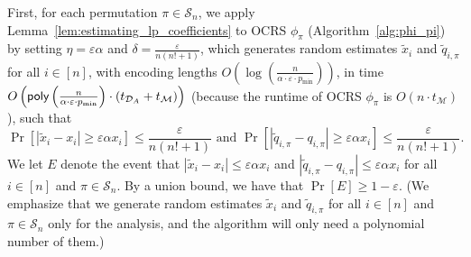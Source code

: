 \documentclass[11pt]{article}
\newcommand{\D}{\mathcal D}
\newcommand{\M}{{\mathcal M}}
\newcommand{\cS}{{\mathcal S}}
\newcommand{\eps}{\varepsilon}
\newcommand{\poly}{\textnormal{\sffamily poly}}
\begin{document}
First, for each permutation $\pi\in\cS_n$, we apply Lemma~\ref{lem:estimating_lp_coefficients} to OCRS $\phi_{\pi}$ (Algorithm~\ref{alg:phi_pi}) by setting $\eta=\eps\alpha$ and $\delta=\frac{\eps}{n(n!+1)}$, which generates random estimates $\tilde{x}_i$ and $\tilde{q}_{i,\pi}$ for all $i\in[n]$, with encoding lengths $O\left(\log\left(\frac{n}{\alpha\cdot\eps\cdot p_{\min}}\right)\right)$, in time $O\left(\poly\left(\frac{n}{\alpha\cdot\eps\cdot p_{\min}}\right)\cdot(t_{\D_{A}}+t_{\M})\right)$ (because the runtime of OCRS $\phi_{\pi}$ is $O(n\cdot t_{\M})$), such that
\[
    \Pr\left[|\tilde{x}_i-x_i|\ge\eps\alpha x_i\right]\le\frac{\eps}{n(n!+1)} \textrm{ and } \Pr\left[|\tilde{q}_{i,\pi}-q_{i,\pi}|\ge\eps\alpha x_i\right]\le\frac{\eps}{n(n!+1)}.
\]
We let $E$ denote the event that $|\tilde{x}_i-x_i|\le\eps\alpha x_i$ and $|\tilde{q}_{i,\pi}-q_{i,\pi}|\le\eps\alpha x_i$ for all $i\in[n]$ and $\pi\in\cS_n$. By a union bound, we have that $\Pr[E]\ge1-\eps$. (We emphasize that we generate random estimates $\tilde{x}_i$ and $\tilde{q}_{i,\pi}$ for all $i\in[n]$ and $\pi\in\cS_n$ only for the analysis, and the algorithm will only need a polynomial number of them.)
\end{document}
